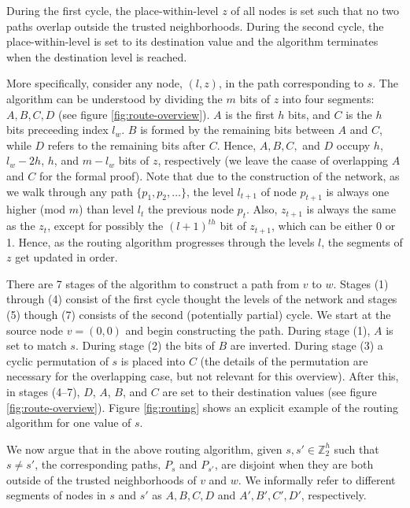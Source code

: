 \documentclass{sig-alternate-05-2015}
\begin{document}
During the first cycle, the place-within-level $z$ of all nodes is set such that
no two paths overlap outside the trusted neighborhoods.
During the second cycle, the place-within-level is set to its destination value
and the algorithm terminates when the destination level is reached.

More specifically, consider any node, $(l,z)$, in the path corresponding to $s$. The algorithm can be understood by dividing the $m$ bits of
$z$ into four segments: $A, B, C, D$ (see figure \ref{fig:route-overview}).
$A$ is the first $h$ bits,
and $C$ is the $h$ bits preceeding index $l_w$.
$B$ is formed by the remaining bits between $A$ and $C$,
while $D$ refers to the remaining bits after $C$.
Hence, $A, B, C, $ and $D$ occupy $h$, $l_w - 2h$, $h$, and $m - l_w$ bits of $z$, respectively
(we leave the caase of overlapping $A$ and $C$ for the formal proof).
Note that due to the construction of the network,
as we walk through any path $\{p_1, p_2, \dots\}$,
the level $l_{t+1}$ of node $p_{t+1}$ is always one higher (mod $m$)
than level $l_t$ the previous node $p_t$.
Also, $z_{t+1}$ is always the same as the $z_t$,
except for possibly the $(l+1)^{th}$ bit of $z_{t+1}$,
which can be either 0 or 1.
Hence, as the routing algorithm progresses through the levels $l$,
the segments of $z$ get updated in order. 

There are 7 stages of the algorithm to construct a path from $v$ to $w$.
Stages (1) through (4) consist of the first cycle thought the levels of
the network and stages (5) though (7) consists of the second
(potentially partial) cycle.
We start at the source node $v = (0,0)$ and begin constructing the path.
During stage (1), $A$ is set to match $s$.
During stage (2) the bits of $B$ are inverted.
During stage (3) a cyclic permutation of $s$ is placed into $C$
(the details of the permutation are necessary for the overlapping case,
but not relevant for this overview).
After this, in stages (4--7), $D$, $A$, $B$, and $C$ are set to their
destination values (see figure \ref{fig:route-overview}).
Figure \ref{fig:routing} shows an explicit example of the routing algorithm
for one value of $s$.

We now argue that in the above routing algorithm,
given $s, s' \in \mathbb{Z}_2^h$ such that $s \neq s'$,
the corresponding paths, $P_s$ and $P_{s'}$,
are disjoint when they are both outside of the trusted neighborhoods of
$v$ and $w$.
We informally refer to different segments of nodes in $s$ and $s'$ as
$A,B,C,D$ and $A',B',C',D'$, respectively.
\end{document}
